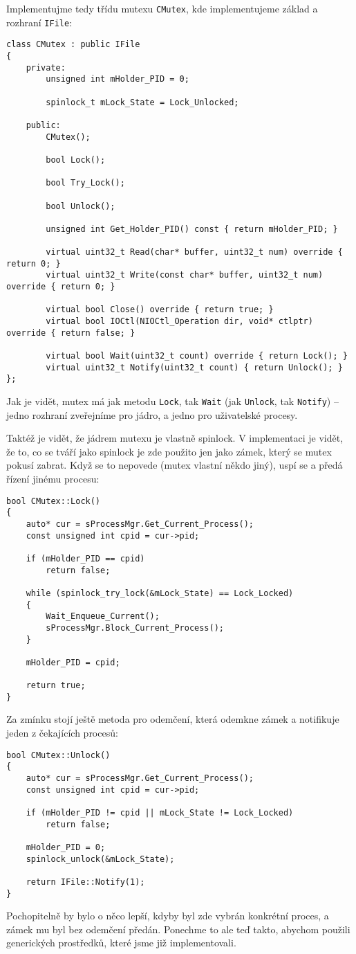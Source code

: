 \documentclass{article}
\begin{document}
Implementujme tedy třídu mutexu \texttt{CMutex}, kde implementujeme základ a rozhraní \texttt{IFile}:
\begin{lstlisting}
class CMutex : public IFile
{
	private:
		unsigned int mHolder_PID = 0;
	
		spinlock_t mLock_State = Lock_Unlocked;
	
	public:
		CMutex();

		bool Lock();
	
		bool Try_Lock();
	
		bool Unlock();
	
		unsigned int Get_Holder_PID() const { return mHolder_PID; }

		virtual uint32_t Read(char* buffer, uint32_t num) override { return 0; }
		virtual uint32_t Write(const char* buffer, uint32_t num) override { return 0; }
	
		virtual bool Close() override { return true; }
		virtual bool IOCtl(NIOCtl_Operation dir, void* ctlptr) override { return false; }
	
		virtual bool Wait(uint32_t count) override { return Lock(); }
		virtual uint32_t Notify(uint32_t count) { return Unlock(); }
};
\end{lstlisting}
Jak je vidět, mutex má jak metodu \texttt{Lock}, tak \texttt{Wait} (jak \texttt{Unlock}, tak \texttt{Notify}) -- jedno rozhraní zveřejníme pro jádro, a jedno pro uživatelské procesy.

Taktéž je vidět, že jádrem mutexu je vlastně spinlock. V implementaci je vidět, že to, co se tváří jako spinlock je zde použito jen jako zámek, který se mutex pokusí zabrat. Když se to nepovede (mutex vlastní někdo jiný), uspí se a předá řízení jinému procesu:
\begin{lstlisting}
bool CMutex::Lock()
{
	auto* cur = sProcessMgr.Get_Current_Process();
	const unsigned int cpid = cur->pid;
	
	if (mHolder_PID == cpid)
		return false;
	
	while (spinlock_try_lock(&mLock_State) == Lock_Locked)
	{
		Wait_Enqueue_Current();
		sProcessMgr.Block_Current_Process();
	}
	
	mHolder_PID = cpid;
	
	return true;
}
\end{lstlisting}
Za zmínku stojí ještě metoda pro odemčení, která odemkne zámek a notifikuje jeden z čekajících procesů:
\begin{lstlisting}
bool CMutex::Unlock()
{
	auto* cur = sProcessMgr.Get_Current_Process();
	const unsigned int cpid = cur->pid;
	
	if (mHolder_PID != cpid || mLock_State != Lock_Locked)
		return false;
	
	mHolder_PID = 0;
	spinlock_unlock(&mLock_State);
	
	return IFile::Notify(1);
}
\end{lstlisting}
Pochopitelně by bylo o něco lepší, kdyby byl zde vybrán konkrétní proces, a zámek mu byl bez odemčení předán. Ponechme to ale teď takto, abychom použili generických prostředků, které jsme již implementovali.
\end{document}
